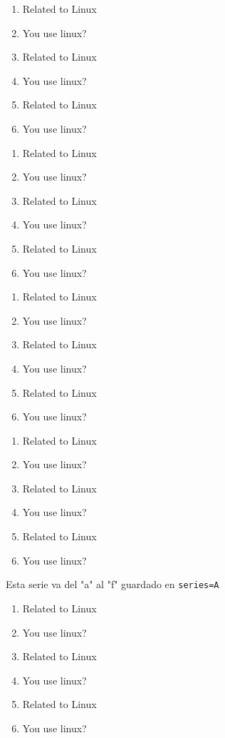 \documentclass{article}
\begin{document}
\begin{enumerate}[resume=A]
  \item Related to Linux
  \item You use linux? %
  \item Related to Linux
  \item You use linux? %
  \item Related to Linux
  \item You use linux? %
\end{enumerate}
\begin{enumerate}[resume=A]
  \item Related to Linux
  \item You use linux? %
  \item Related to Linux
  \item You use linux? %
  \item Related to Linux
  \item You use linux? %
\end{enumerate}
\begin{enumerate}[resume=A]
  \item Related to Linux
  \item You use linux? %
  \item Related to Linux
  \item You use linux? %
  \item Related to Linux
  \item You use linux? %
\end{enumerate}


\begin{enumerate}[resume]
  \item Related to Linux
  \item You use linux? %
  \item Related to Linux
  \item You use linux? %
  \item Related to Linux
  \item You use linux? %
\end{enumerate}


\stop


Esta serie va del "a" al "f" guardado en \verb+series=A+

\begin{enumerate}[label=\alph*, series=A]
  \item Related to Linux
  \item You use linux? %
  \item Related to Linux
  \item You use linux? %
  \item Related to Linux
  \item You use linux? %
\end{enumerate}
\end{document}
